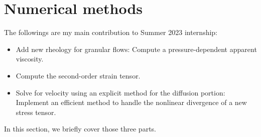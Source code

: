 \section{Numerical methods}
 The followings are my main contribution to  Summer 2023 internship:
\begin{itemize}
	\item Add new rheology for granular flows: Compute a pressure-dependent apparent viscosity.
	\item Compute the second-order strain tensor.
	\item Solve for velocity using an explicit method for the diffusion portion: Implement an efficient method to handle the nonlinear divergence of a new stress tensor.
\end{itemize}
In this section, we briefly cover those three parts.

